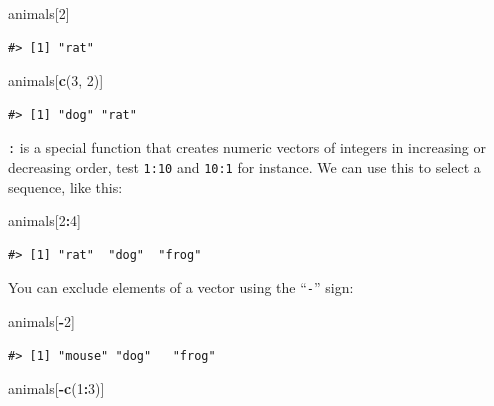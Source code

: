 \documentclass[
]{book}
\newenvironment{Shaded}{\begin{snugshade}}{\end{snugshade}}
\newcommand{\DecValTok}[1]{\textcolor[rgb]{0.00,0.00,0.81}{#1}}
\newcommand{\KeywordTok}[1]{\textcolor[rgb]{0.13,0.29,0.53}{\textbf{#1}}}
\newcommand{\NormalTok}[1]{#1}
\newcommand{\OperatorTok}[1]{\textcolor[rgb]{0.81,0.36,0.00}{\textbf{#1}}}
\begin{document}
\begin{Shaded}
\begin{Highlighting}[]
\NormalTok{animals[}\DecValTok{2}\NormalTok{]}
\end{Highlighting}
\end{Shaded}

\begin{verbatim}
#> [1] "rat"
\end{verbatim}

\begin{Shaded}
\begin{Highlighting}[]
\NormalTok{animals[}\KeywordTok{c}\NormalTok{(}\DecValTok{3}\NormalTok{, }\DecValTok{2}\NormalTok{)]}
\end{Highlighting}
\end{Shaded}

\begin{verbatim}
#> [1] "dog" "rat"
\end{verbatim}

\texttt{:} is a special function that creates numeric vectors of integers in increasing
or decreasing order, test \texttt{1:10} and \texttt{10:1} for instance. We can use this to select a sequence, like this:

\begin{Shaded}
\begin{Highlighting}[]
\NormalTok{animals[}\DecValTok{2}\OperatorTok{:}\DecValTok{4}\NormalTok{]}
\end{Highlighting}
\end{Shaded}

\begin{verbatim}
#> [1] "rat"  "dog"  "frog"
\end{verbatim}

You can exclude elements of a vector using the ``\texttt{-}'' sign:

\begin{Shaded}
\begin{Highlighting}[]
\NormalTok{animals[}\OperatorTok{-}\DecValTok{2}\NormalTok{]}
\end{Highlighting}
\end{Shaded}

\begin{verbatim}
#> [1] "mouse" "dog"   "frog"
\end{verbatim}

\begin{Shaded}
\begin{Highlighting}[]
\NormalTok{animals[}\OperatorTok{-}\KeywordTok{c}\NormalTok{(}\DecValTok{1}\OperatorTok{:}\DecValTok{3}\NormalTok{)]}
\end{Highlighting}
\end{Shaded}
\end{document}
